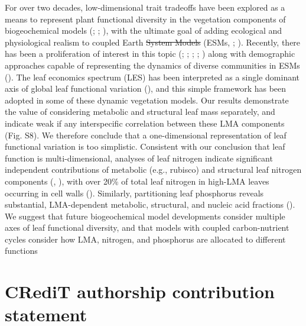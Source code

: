 \documentclass[
  12pt,
  letterpaper,
  DIV=11,
  numbers=noendperiod]{scrartcl}
\providecommand{\DIFadd}[1]{{\protect\color{blue}\uwave{#1}}} %
\providecommand{\DIFdel}[1]{{\protect\color{red}\sout{#1}}}                      %
\providecommand{\DIFaddbegin}{} %
\providecommand{\DIFaddend}{} %
\providecommand{\DIFdelbegin}{} %
\providecommand{\DIFdelend}{} %
\newcommand{\DIFscaledelfig}{0.5}
\newlength{\DIFdelgraphicswidth} %
\newlength{\DIFdelgraphicsheight} %
\newcommand{\DIFaddincludegraphics}[2][]{{\color{blue}\fbox{\DIFOincludegraphics[#1]{#2}}}} %
\newcommand{\DIFdelincludegraphics}[2][]{%
\sbox{\DIFdelgraphicsbox}{\DIFOincludegraphics[#1]{#2}}%
\settoboxwidth{\DIFdelgraphicswidth}{\DIFdelgraphicsbox} %
\settoboxtotalheight{\DIFdelgraphicsheight}{\DIFdelgraphicsbox} %
\scalebox{\DIFscaledelfig}{%
\parbox[b]{\DIFdelgraphicswidth}{\usebox{\DIFdelgraphicsbox}\\[-\baselineskip] \rule{\DIFdelgraphicswidth}{0em}}\llap{\resizebox{\DIFdelgraphicswidth}{\DIFdelgraphicsheight}{%
\setlength{\unitlength}{\DIFdelgraphicswidth}%
\begin{picture}(1,1)%
\thicklines\linethickness{2pt} %
{\color[rgb]{1,0,0}\put(0,0){\framebox(1,1){}}}%
{\color[rgb]{1,0,0}\put(0,0){\line( 1,1){1}}}%
{\color[rgb]{1,0,0}\put(0,1){\line(1,-1){1}}}%
\end{picture}%
}\hspace*{3pt}}} %
} %
\DeclareRobustCommand{\DIFaddbegin}{\DIFOaddbegin \let\includegraphics\DIFaddincludegraphics} %
\DeclareRobustCommand{\DIFaddend}{\DIFOaddend \let\includegraphics\DIFOincludegraphics} %
\DeclareRobustCommand{\DIFdelbegin}{\DIFOdelbegin \let\includegraphics\DIFdelincludegraphics} %
\DeclareRobustCommand{\DIFdelend}{\DIFOaddend \let\includegraphics\DIFOincludegraphics} %
\begin{document}
For over two decades, low-dimensional trait tradeoffs have been explored
as a means to represent plant functional diversity in the vegetation
components of biogeochemical models (; ;
), with the ultimate
goal of adding ecological and physiological realism to coupled Earth
\DIFdelbegin \DIFdel{System Models }\DIFdelend \DIFaddbegin \DIFadd{system models }\DIFaddend (ESMs, ;
). Recently,
there has been a proliferation of interest in this topic
(;
;
;
;
) along with
demographic approaches capable of representing the dynamics of diverse
communities in ESMs ().
The leaf economics spectrum (LES) has been interpreted as a single
dominant axis of global leaf functional variation
(), and this simple
framework has been adopted in some of these dynamic vegetation models.
Our results demonstrate the value of considering metabolic and
structural leaf mass separately, and indicate weak if any interspecific
correlation between these LMA components (Fig. S8). We therefore
conclude that a one-dimensional representation of leaf functional
variation is too simplistic. Consistent with our conclusion that leaf
function is multi-dimensional, analyses of leaf nitrogen indicate
significant independent contributions of metabolic (e.g., rubisco) and
structural leaf nitrogen components (, ), with over 20\% of total leaf
nitrogen in high-LMA leaves occurring in cell walls
(). Similarly, partitioning
leaf phosphorus reveals substantial, LMA-dependent metabolic,
structural, and nucleic acid fractions (). We suggest that future biogeochemical model
developments consider multiple axes of leaf functional diversity, and
that models with coupled carbon-nutrient cycles consider how LMA,
nitrogen, and phosphorus are allocated to different functions

\section{CRediT authorship contribution
statement}\label{credit-authorship-contribution-statement}
\end{document}
